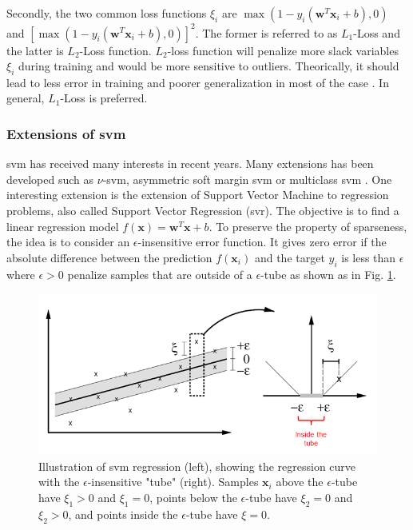 Secondly, the two common loss functions $\xi_i$ are $\max(1-y_i (\textbf{w}^T \textbf{x}_i+b), 0)$ and $[\max(1-y_i(\textbf{w}^T \textbf{x}_i+b), 0)]^2$. The former is referred to as $L_1$-Loss and the latter is $L_2$-Loss function. $L_2$-loss function will penalize more slack variables $\xi_i$ during training and would be more sensitive to outliers. Theorically, it should lead to less error in training and poorer generalization in most of the case \cite{Hsu2008}. In general, $L_1$-Loss is preferred.



\subsubsection{Extensions of {\sc svm}}
{\sc svm} has received many interests in recent years. Many extensions has been developed such as $\nu$-{\sc svm}, asymmetric soft margin {\sc svm} or multiclass {\sc svm} \cite{Kijsirikul2002,Crammer2001}. One interesting extension is the extension of Support Vector Machine to regression problems, also called Support Vector Regression ({\sc svr}). The objective is to find a linear regression model $f(\textbf{x})=\textbf{w}^T\textbf{x}+b$. To preserve the property of sparseness, the idea is to consider an $\epsilon$-insensitive error function. It gives zero error if the absolute difference between
the prediction $f(\textbf{x}_i)$ and the target $y_i$ is less than $\epsilon$ where $\epsilon > 0$ penalize samples that are outside of a $\epsilon$-tube as shown as in Fig. \ref{fig:SVR_tube}.

\begin{figure}[h!]
\centering
\includegraphics[width=0.8\linewidth]{images/SVR_tube}
\caption{Illustration of {\sc svm} regression (left), showing the regression curve with the $\epsilon$-insensitive "tube" (right). Samples $\textbf{x}_i$ above the $\epsilon$-tube have $\xi_1 > 0$ and $\xi_1 = 0$, points below the $\epsilon$-tube have $\xi_2 = 0$ and $\xi_2 > 0$, and points inside the $\epsilon$-tube have $\xi = 0$.}
\label{fig:SVR_tube}
\end{figure}

